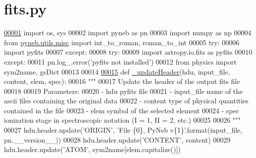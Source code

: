 \hypertarget{fits_8py_source}{}\section{fits.\+py}
\label{fits_8py_source}

\begin{DoxyCode}
\hypertarget{fits_8py_source_l00001}{}\hyperlink{namespacepyneb_1_1utils_1_1fits}{00001} \textcolor{keyword}{import} os, sys
00002 \textcolor{keyword}{import} pyneb \textcolor{keyword}{as} pn
00003 \textcolor{keyword}{import} numpy \textcolor{keyword}{as} np
00004 \textcolor{keyword}{from} \hyperlink{namespacepyneb_1_1utils_1_1misc}{pyneb.utils.misc} \textcolor{keyword}{import} int\_to\_roman, roman\_to\_int
00005 \textcolor{keywordflow}{try}:
00006     \textcolor{keyword}{import} pyfits
00007 \textcolor{keywordflow}{except}:
00008     \textcolor{keywordflow}{try}:
00009         \textcolor{keyword}{import} astropy.io.fits \textcolor{keyword}{as} pyfits
00010     \textcolor{keywordflow}{except}:
00011         pn.log\_.error(\textcolor{stringliteral}{'pyfits not installed'})
00012 \textcolor{keyword}{from} physics \textcolor{keyword}{import} sym2name, gsDict
00013 
00014     
\hypertarget{fits_8py_source_l00015}{}\hyperlink{namespacepyneb_1_1utils_1_1fits_a2c9c6cf69be4278cdfb529f3a8f3dced}{00015} \textcolor{keyword}{def }\hyperlink{namespacepyneb_1_1utils_1_1fits_a2c9c6cf69be4278cdfb529f3a8f3dced}{\_updateHeader}(hdu, input\_file, content, elem, spec):
00016     \textcolor{stringliteral}{"""}
00017 \textcolor{stringliteral}{    Update the header of the output fits file}
00018 \textcolor{stringliteral}{}
00019 \textcolor{stringliteral}{    Parameters: }
00020 \textcolor{stringliteral}{        - hdu          pyfits file}
00021 \textcolor{stringliteral}{        - input\_file   name of the ascii files containing the original data}
00022 \textcolor{stringliteral}{        - content      type of physical quantities contained in the file}
00023 \textcolor{stringliteral}{        - elem         symbol of the selected element}
00024 \textcolor{stringliteral}{        - spec         ionization stage in spectroscopic notation (I = 1, II = 2, etc.)}
00025 \textcolor{stringliteral}{        }
00026 \textcolor{stringliteral}{    """}
00027     hdu.header.update(\textcolor{stringliteral}{'ORIGIN'}, \textcolor{stringliteral}{'File \{0\}, PyNeb v\{1\}'}.format(input\_file, pn.\_\_version\_\_))
00028     hdu.header.update(\textcolor{stringliteral}{'CONTENT'}, content)
00029     hdu.header.update(\textcolor{stringliteral}{'ATOM'}, sym2name[elem.capitalize()])

\end{DoxyCode}
